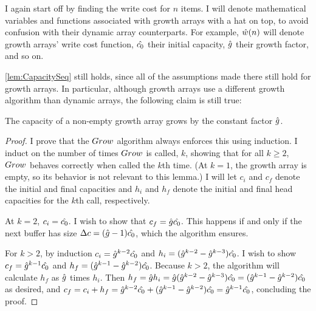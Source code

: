 \HdrGrowthArrayImpl

\HdrTimeComplex

I again start off by finding the write cost for $n$ items. I will denote mathematical variables and functions associated with growth arrays with a hat on top, to avoid confusion with their dynamic array counterparts. For example, $\hat{w}(n)$ will denote growth arrays' write cost function, $\hat{c_0}$ their initial capacity, $\hat{g}$ their growth factor, and so on.

\ref{lem:CapacitySeq} still holds, since all of the assumptions made there still hold for growth arrays. In particular, although growth arrays use a different growth algorithm than dynamic arrays, the following claim is still true:

\begin{lemma}
	The capacity of a non-empty growth array grows by the constant factor $\hat{g}$.
\end{lemma}

\begin{proof}
	I prove that the $Grow$ algorithm always enforces this using induction. I induct on the number of times $Grow$ is called, $k$, showing that for all $k \geq 2$, $Grow$ behaves correctly when called the $k$th time. (At $k = 1$, the growth array is empty, so its behavior is not relevant to this lemma.) I will let $c_i$ and $c_f$ denote the initial and final capacities and $h_i$ and $h_f$ denote the initial and final head capacities for the $k$th call, respectively.

	At $k = 2$, $c_i = \hat{c_0}$. I wish to show that $c_f = \hat{g}\hat{c_0}$. This happens if and only if the next buffer has size $\Delta c = (\hat{g} - 1)\hat{c_0}$, which the algorithm ensures.
	
	For $k > 2$, by induction $c_i = \hat{g}^{k - 2}\hat{c_0}$ and $h_i = (\hat{g}^{k - 2} - \hat{g}^{k - 3})\hat{c_0}$. I wish to show $c_f = \hat{g}^{k - 1}\hat{c_0}$ and $h_f = (\hat{g}^{k - 1} - \hat{g}^{k - 2})\hat{c_0}$. Because $k > 2$, the algorithm will calculate $h_f$ as $\hat{g}$ times $h_i$. Then $h_f = \hat{g} h_i = \hat{g} (\hat{g}^{k - 2} - \hat{g}^{k - 3})\hat{c_0} = (\hat{g}^{k - 1} - \hat{g}^{k - 2})\hat{c_0}$ as desired, and $c_f = c_i + h_f = \hat{g}^{k - 2}\hat{c_0} + (\hat{g}^{k - 1} - \hat{g}^{k - 2})\hat{c_0} = \hat{g}^{k - 1}\hat{c_0}$, concluding the proof.
\end{proof}

